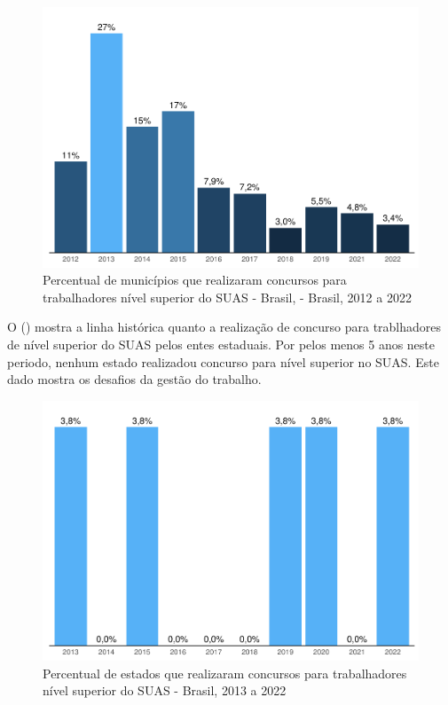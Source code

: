 \documentclass[
  brazilian]{report}
\begin{document}
\begin{figure}
\includegraphics{Censo-SUAS-2022_files/figure-latex/conc_munic-1} \caption[Percentual de municípios que realizaram concursos para trabalhadores nível superior do SUAS - Brasil, - Brasil, 2012 a 2022]{Percentual de municípios que realizaram concursos para trabalhadores nível superior do SUAS - Brasil, - Brasil, 2012 a 2022}\label{fig:conc_munic}
\end{figure}

O () mostra a linha histórica quanto a realização
de concurso para trablhadores de nível superior do SUAS pelos entes
estaduais. Por pelos menos 5 anos neste periodo, nenhum estado
realizadou concurso para nível superior no SUAS. Este dado mostra os
desafios da gestão do trabalho.

\begin{figure}
\includegraphics{Censo-SUAS-2022_files/figure-latex/conc_estado-1} \caption[Percentual de estados que realizaram concursos para trabalhadores nível superior do SUAS - Brasil, 2013 a 2022]{Percentual de estados que realizaram concursos para trabalhadores nível superior do SUAS - Brasil, 2013 a 2022}\label{fig:conc_estado}
\end{figure}
\end{document}
